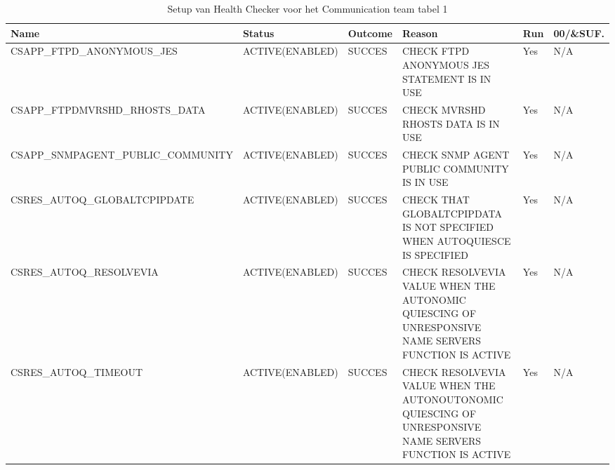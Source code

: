 \begin{landscape}
	\begin{table}[h]
		\begin{tabular}{|l|l|l|p{4.5cm}|l|l|}
			\hline
			\textbf{Name}                       & \textbf{Status}   & \textbf{Outcome} & \textbf{Reason}                                                                                                & \textbf{Run} & \textbf{00/\&SUF.} \\ \hline
			CSAPP\_FTPD\_ANONYMOUS\_JES         & ACTIVE(ENABLED)   & SUCCES           & CHECK   FTPD ANONYMOUS JES STATEMENT IS IN USE                                                                 & Yes          & N/A                \\ \hline
			CSAPP\_FTPDMVRSHD\_RHOSTS\_DATA     & ACTIVE(ENABLED)   & SUCCES           & CHECK   MVRSHD RHOSTS DATA IS IN USE                                                                           & Yes          & N/A                \\ \hline
			CSAPP\_SNMPAGENT\_PUBLIC\_COMMUNITY & ACTIVE(ENABLED)   & SUCCES           & CHECK   SNMP AGENT PUBLIC COMMUNITY IS IN USE                                                                  & Yes          & N/A                \\ \hline
			CSRES\_AUTOQ\_GLOBALTCPIPDATE       & ACTIVE(ENABLED)   & SUCCES           & CHECK   THAT GLOBALTCPIPDATA IS NOT    SPECIFIED   WHEN AUTOQUIESCE IS SPECIFIED                               & Yes          & N/A                \\ \hline
			CSRES\_AUTOQ\_RESOLVEVIA            & ACTIVE(ENABLED)   & SUCCES           & CHECK   RESOLVEVIA VALUE WHEN THE AUTONOMIC QUIESCING OF UNRESPONSIVE NAME SERVERS FUNCTION IS ACTIVE          & Yes          & N/A                \\ \hline
			CSRES\_AUTOQ\_TIMEOUT               & ACTIVE(ENABLED)   & SUCCES           & CHECK   RESOLVEVIA VALUE WHEN THE AUTONOUTONOMIC QUIESCING OF UNRESPONSIVE   NAME   SERVERS FUNCTION IS ACTIVE & Yes          & N/A                \\ \hline
		\end{tabular}
		\caption[Health Checker Communication team tabel 1]{Setup van Health Checker voor het Communication team tabel 1}
		\label{tbl:Communication Team Tabel 1}
	\end{table}
\end{landscape}

